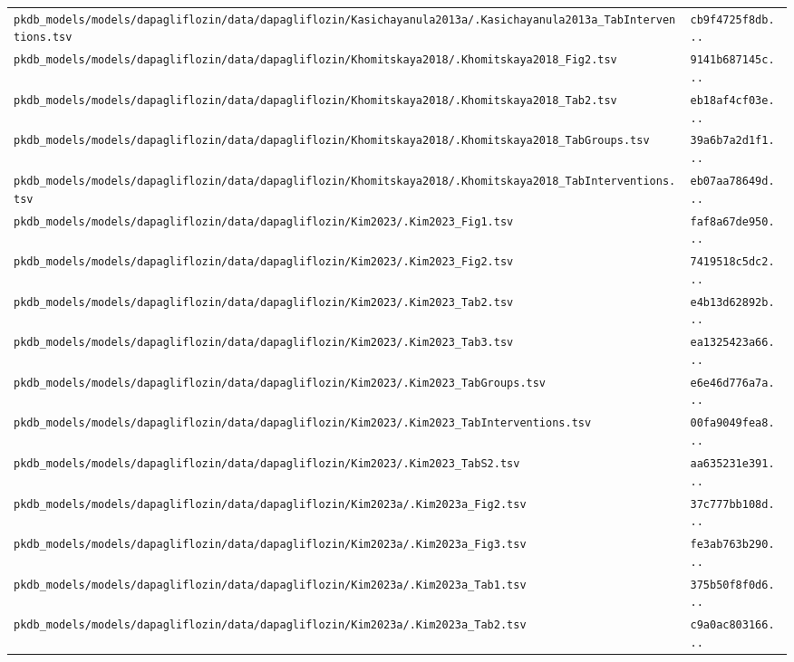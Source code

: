 \begin{longtable}{ll}
\texttt{pkdb\_models/models/dapagliflozin/data/dapagliflozin/Kasichayanula2013a/.Kasichayanula2013a\_TabInterventions.tsv} & \texttt{cb9f4725f8db...} \\
\texttt{pkdb\_models/models/dapagliflozin/data/dapagliflozin/Khomitskaya2018/.Khomitskaya2018\_Fig2.tsv} & \texttt{9141b687145c...} \\
\texttt{pkdb\_models/models/dapagliflozin/data/dapagliflozin/Khomitskaya2018/.Khomitskaya2018\_Tab2.tsv} & \texttt{eb18af4cf03e...} \\
\texttt{pkdb\_models/models/dapagliflozin/data/dapagliflozin/Khomitskaya2018/.Khomitskaya2018\_TabGroups.tsv} & \texttt{39a6b7a2d1f1...} \\
\texttt{pkdb\_models/models/dapagliflozin/data/dapagliflozin/Khomitskaya2018/.Khomitskaya2018\_TabInterventions.tsv} & \texttt{eb07aa78649d...} \\
\texttt{pkdb\_models/models/dapagliflozin/data/dapagliflozin/Kim2023/.Kim2023\_Fig1.tsv} & \texttt{faf8a67de950...} \\
\texttt{pkdb\_models/models/dapagliflozin/data/dapagliflozin/Kim2023/.Kim2023\_Fig2.tsv} & \texttt{7419518c5dc2...} \\
\texttt{pkdb\_models/models/dapagliflozin/data/dapagliflozin/Kim2023/.Kim2023\_Tab2.tsv} & \texttt{e4b13d62892b...} \\
\texttt{pkdb\_models/models/dapagliflozin/data/dapagliflozin/Kim2023/.Kim2023\_Tab3.tsv} & \texttt{ea1325423a66...} \\
\texttt{pkdb\_models/models/dapagliflozin/data/dapagliflozin/Kim2023/.Kim2023\_TabGroups.tsv} & \texttt{e6e46d776a7a...} \\
\texttt{pkdb\_models/models/dapagliflozin/data/dapagliflozin/Kim2023/.Kim2023\_TabInterventions.tsv} & \texttt{00fa9049fea8...} \\
\texttt{pkdb\_models/models/dapagliflozin/data/dapagliflozin/Kim2023/.Kim2023\_TabS2.tsv} & \texttt{aa635231e391...} \\
\texttt{pkdb\_models/models/dapagliflozin/data/dapagliflozin/Kim2023a/.Kim2023a\_Fig2.tsv} & \texttt{37c777bb108d...} \\
\texttt{pkdb\_models/models/dapagliflozin/data/dapagliflozin/Kim2023a/.Kim2023a\_Fig3.tsv} & \texttt{fe3ab763b290...} \\
\texttt{pkdb\_models/models/dapagliflozin/data/dapagliflozin/Kim2023a/.Kim2023a\_Tab1.tsv} & \texttt{375b50f8f0d6...} \\
\texttt{pkdb\_models/models/dapagliflozin/data/dapagliflozin/Kim2023a/.Kim2023a\_Tab2.tsv} & \texttt{c9a0ac803166...} \\

\end{longtable}
